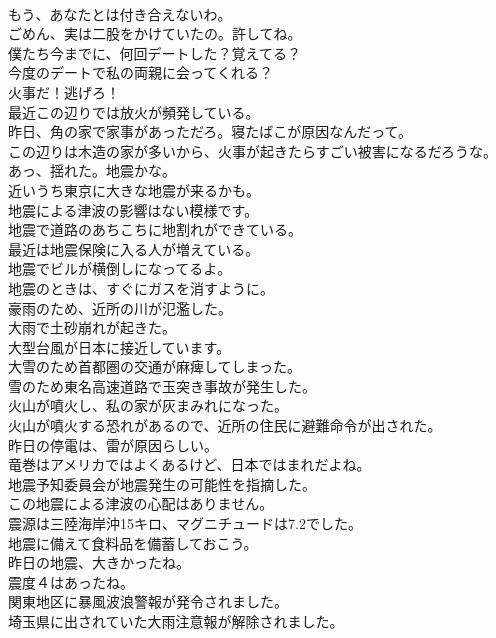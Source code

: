 \documentclass[8pt]{extreport}
\begin{document}
\begin{CJK}{UTF8}{min}
\\	もう、あなたとは付き合えないわ。	
\\	ごめん、実は二股をかけていたの。許してね。	
\\	僕たち今までに、何回デートした？覚えてる？	
\\	今度のデートで私の両親に会ってくれる？	
\\	火事だ！逃げろ！	
\\	最近この辺りでは放火が頻発している。	
\\	昨日、角の家で家事があっただろ。寝たばこが原因なんだって。	
\\	この辺りは木造の家が多いから、火事が起きたらすごい被害になるだろうな。	
\\	あっ、揺れた。地震かな。	
\\	近いうち東京に大きな地震が来るかも。	
\\	地震による津波の影響はない模様です。	
\\	地震で道路のあちこちに地割れができている。	
\\	最近は地震保険に入る人が増えている。	
\\	地震でビルが横倒しになってるよ。	
\\	地震のときは、すぐにガスを消すように。	
\\	豪雨のため、近所の川が氾濫した。	
\\	大雨で土砂崩れが起きた。	
\\	大型台風が日本に接近しています。	
\\	大雪のため首都圏の交通が麻痺してしまった。	
\\	雪のため東名高速道路で玉突き事故が発生した。	
\\	火山が噴火し、私の家が灰まみれになった。	
\\	火山が噴火する恐れがあるので、近所の住民に避難命令が出された。	
\\	昨日の停電は、雷が原因らしい。	
\\	竜巻はアメリカではよくあるけど、日本ではまれだよね。	
\\	地震予知委員会が地震発生の可能性を指摘した。	
\\	この地震による津波の心配はありません。	
\\	震源は三陸海岸沖15キロ、マグニチュードは7.2でした。	
\\	地震に備えて食料品を備蓄しておこう。	
\\	昨日の地震、大きかったね。	
\\	震度４はあったね。	
\\	関東地区に暴風波浪警報が発令されました。	
\\	埼玉県に出されていた大雨注意報が解除されました。	

\end{CJK}
\end{document}
